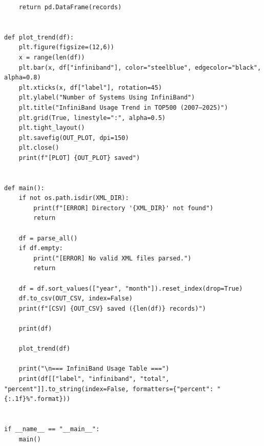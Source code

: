 \documentclass[14pt,a4paper]{extarticle}
\begin{document}
\begin{verbatim}
    return pd.DataFrame(records)


def plot_trend(df):
    plt.figure(figsize=(12,6))
    x = range(len(df))
    plt.bar(x, df["infiniband"], color="steelblue", edgecolor="black", alpha=0.8)
    plt.xticks(x, df["label"], rotation=45)
    plt.ylabel("Number of Systems Using InfiniBand")
    plt.title("InfiniBand Usage Trend in TOP500 (2007–2025)")
    plt.grid(True, linestyle=":", alpha=0.5)
    plt.tight_layout()
    plt.savefig(OUT_PLOT, dpi=150)
    plt.close()
    print(f"[PLOT] {OUT_PLOT} saved")


def main():
    if not os.path.isdir(XML_DIR):
        print(f"[ERROR] Directory '{XML_DIR}' not found")
        return

    df = parse_all()
    if df.empty:
        print("[ERROR] No valid XML files parsed.")
        return

    df = df.sort_values(["year", "month"]).reset_index(drop=True)
    df.to_csv(OUT_CSV, index=False)
    print(f"[CSV] {OUT_CSV} saved ({len(df)} records)")

    print(df)

    plot_trend(df)

    print("\n=== InfiniBand Usage Table ===")
    print(df[["label", "infiniband", "total", "percent"]].to_string(index=False, formatters={"percent": "{:.1f}%".format}))


if __name__ == "__main__":
    main()


\end{verbatim}
\end{document}
